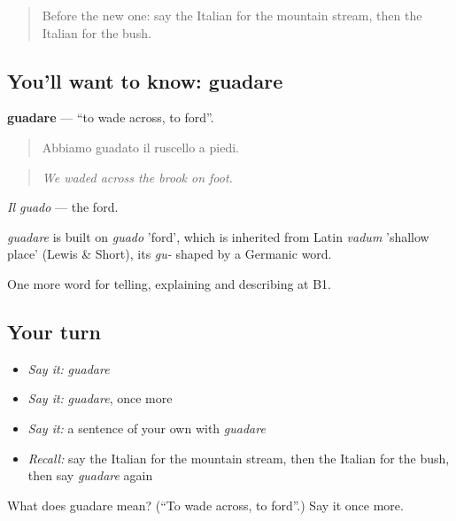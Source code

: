 \label{lesson:IT-C460-guadare}



\begin{quote}
Before the new one: say the Italian for the mountain stream, then the Italian for the bush.
\end{quote}

\subsection*{You'll want to know: guadare}
\textbf{guadare} — \textquotedblleft{}to wade across, to ford\textquotedblright{}.

\begin{quote}
Abbiamo guadato il ruscello a piedi.
\end{quote}

\begin{quote}
\emph{We waded across the brook on foot.}
\end{quote}

\emph{Il guado} — the ford.

\begin{cousinweb}
\emph{guadare} is built on \emph{guado} 'ford', which is inherited from Latin \emph{vadum} 'shallow place' (Lewis \& Short), its \emph{gu-} shaped by a Germanic word.
\end{cousinweb}

\begin{grammarlens}[title={What you've built}]
One more word for telling, explaining and describing at B1.
\end{grammarlens}

\subsection*{Your turn}
\begin{itemize}
\raggedright
  \item \emph{Say it:} \emph{guadare}
  \item \emph{Say it:} \emph{guadare}, once more
  \item \emph{Say it:} a sentence of your own with \emph{guadare}
  \item \emph{Recall:} say the Italian for the mountain stream, then the Italian for the bush, then say \emph{guadare} again
\end{itemize}

\begin{tcolorbox}[breakable,colback=teal!4,colframe=teal!35!black,title={Before you move on}]
What does guadare mean? (\textquotedblleft{}To wade across, to ford\textquotedblright{}.) Say it once more.
\end{tcolorbox}
